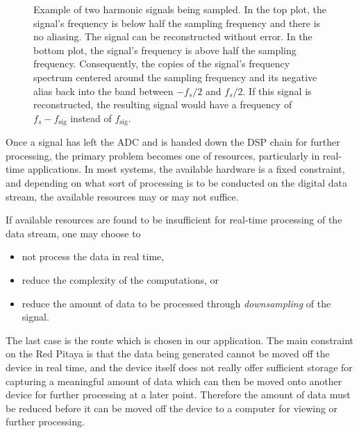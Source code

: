\begin{figure}
    \centering
    
    \caption[Aliasing With Harmonic Signals]{%
        Example  of  two harmonic  signals  being  sampled. In the  top  plot,
        the  signal's  frequency is  below  half  the sampling  frequency  and
        there  is  no  aliasing. The   signal  can  be  reconstructed  without
        error.\protect\newline
        In the bottom plot, the signal's  frequency is above half the sampling
        frequency. Consequently, the copies of the signal's frequency spectrum
        centered around  the sampling  frequency and  its negative  alias back
        into  the  band  between  $-f_s/2$  and  $f_s/2$. If  this  signal  is
        reconstructed, the resulting  signal would have a frequency  of $f_s -
        f_{\mathrm{sig}}$ instead of $f_{\mathrm{sig}}$.%
    }
    \label{fig:aliasing:dirac}
\end{figure}


Once a signal  has left the ADC and  is handed down the DSP  chain for further
processing,  the primary  problem becomes  one of  resources, particularly  in
real-time applications. In  most systems,  the available  hardware is  a fixed
constraint, and depending on what sort of processing is to be conducted on the
digital data stream, the available resources may or may not suffice.

If available resources are found to be insufficient for real-time processing of
the data stream, one may choose to
\begin{itemize}\tightlist
    \item
        not process the data in real time,
    \item
        reduce the complexity of the computations, or
    \item
        reduce the amount of data to be processed through \emph{downsampling}
        of the signal.
\end{itemize}
The  last case  is the  route  which is  chosen in  our application. The  main
constraint on the Red Pitaya is that  the data being generated cannot be moved
off the  device in  real time,  and the  device itself  does not  really offer
sufficient storage for capturing a meaningful amount of data which can then be
moved onto another  device for further processing at  a later point. Therefore
the amount of data must be reduced before  it can be moved off the device to a
computer for viewing or further processing.

